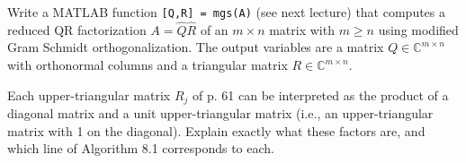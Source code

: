 \documentclass[12pt]{article}
\newenvironment{ex}[2][Exercise]{\begin{trivlist}
		\item[\hskip \labelsep {\bfseries #1}\hskip \labelsep {\bfseries #2.}]}{\end{trivlist}}
\begin{document}
\begin{ex}{8.2}
	Write a MATLAB function \texttt{[Q,R] = mgs(A)} (see next lecture) that computes a reduced QR factorization
	$A=\hat{Q}\hat{R}$ of an $m\times n$ matrix with $m\geq n$ using modified Gram Schmidt orthogonalization.
	The output variables are a matrix $Q\in\mathbb{C}^{m\times n}$ with orthonormal columns and a triangular
	matrix $R\in\mathbb{C}^{m\times n}$.
\end{ex}

\begin{ex}{3}
	Each upper-triangular matrix $R_j$ of p. 61 can be interpreted as the product of a diagonal matrix and
	a unit upper-triangular matrix (i.e., an upper-triangular matrix with 1 on the diagonal). Explain exactly
	what these factors are, and which line of Algorithm 8.1 corresponds to each.
\end{ex}
\end{document}
